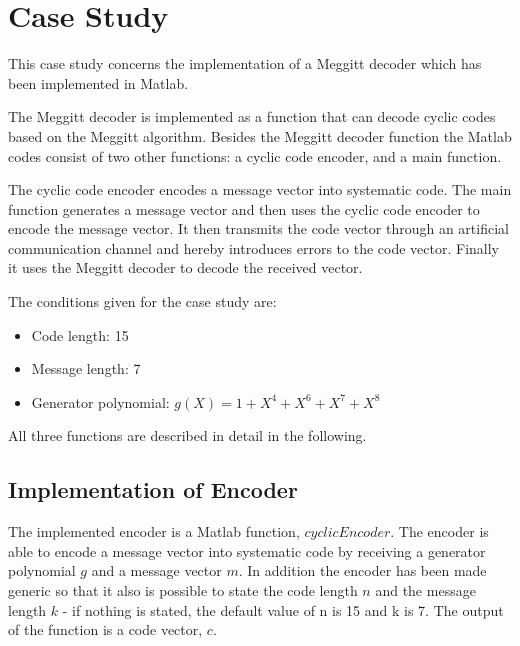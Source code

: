 \documentclass[Main]{subfiles}
\begin{document}
\section{Case Study}

%
%
%

This case study concerns the implementation of a Meggitt decoder which has been implemented in Matlab. 

The Meggitt decoder is implemented as a function that can decode cyclic codes based on the Meggitt algorithm. Besides the Meggitt decoder function the Matlab codes consist of two other functions: a cyclic code encoder, and a main function.

The cyclic code encoder encodes a message vector into systematic code. The main function generates a message vector and then uses the cyclic code encoder to encode the message vector. It then transmits the code vector through an artificial communication channel and hereby introduces errors to the code vector. Finally it uses the Meggitt decoder to decode the received vector. 

The conditions given for the case study are: 
\begin{itemize} \itemsep0pt \parskip0pt 
\item Code length: 15
\item Message length: 7
\item Generator polynomial: $g(X)=1+X^4+X^6+X^7+X^8$
\end{itemize} 

All three functions are described in detail in the following. 











\subsection{Implementation of Encoder}
\label{sec:ImplementEncoder}
The implemented encoder is a Matlab function, $cyclicEncoder$. The encoder is able to encode a message vector into systematic code by receiving a generator polynomial $g$ and a message vector $m$. In addition the encoder has been made generic so that it also is possible to state the code length $n$ and the message length $k$ - if nothing is stated, the default value of n is 15 and k is 7. The output of the function is a code vector, $c$. 
\end{document}
